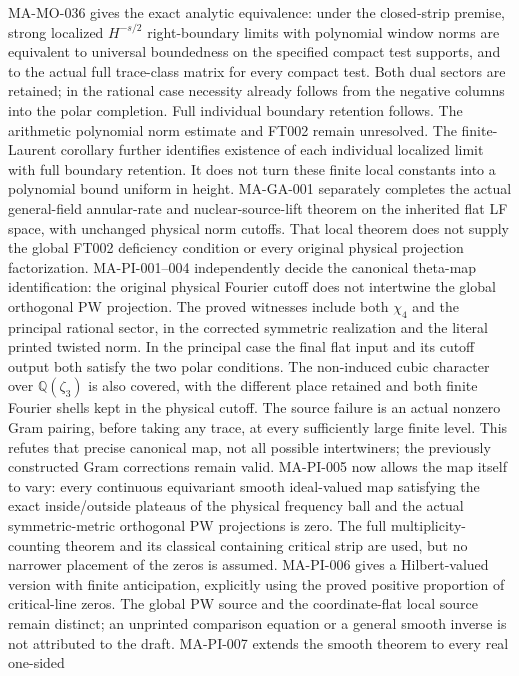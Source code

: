 \documentclass[11pt,a4paper]{article}
\begin{document}
MA-MO-036 gives the exact analytic equivalence: under the
closed-strip premise, strong localized $H^{-s/2}$ right-boundary
limits with polynomial window norms are equivalent to universal
boundedness on the specified compact test supports, and to the
actual full trace-class matrix for every compact test. Both dual
sectors are retained; in the rational case necessity already
follows from the negative columns into the polar completion.
Full individual boundary retention follows. The arithmetic
polynomial norm estimate and FT002 remain unresolved.
The finite-Laurent corollary further identifies existence of each
individual localized limit with full boundary retention. It
does not turn these finite local constants into a polynomial
bound uniform in height.
MA-GA-001 separately completes the actual
general-field annular-rate and nuclear-source-lift theorem on
the inherited flat LF space, with unchanged physical norm
cutoffs. That local theorem does not supply the global FT002
deficiency condition or every original physical projection
factorization.
MA-PI-001--004 independently decide the canonical theta-map
identification: the original physical Fourier cutoff does
not intertwine the global orthogonal PW projection. The
proved witnesses include both $\chi_4$ and the principal
rational sector, in the corrected symmetric realization
and the literal printed twisted norm. In the principal
case the final flat input and its cutoff output both
satisfy the two polar conditions. The non-induced cubic
character over $\mathbb Q(\zeta_3)$ is also covered,
with the different place retained and both finite Fourier
shells kept in the physical cutoff. The source failure is
an actual nonzero Gram pairing, before taking any trace,
at every sufficiently large finite level. This refutes
that precise canonical map, not all possible intertwiners;
the previously constructed Gram corrections remain valid.
MA-PI-005 now allows the map itself to vary: every continuous
equivariant smooth ideal-valued map satisfying the exact
inside/outside plateaus of the physical frequency ball and the
actual symmetric-metric orthogonal PW projections is zero.
The full multiplicity-counting theorem and its classical
containing critical strip are used, but no narrower placement
of the zeros is assumed. MA-PI-006 gives a Hilbert-valued version
with finite anticipation, explicitly using the proved positive
proportion of critical-line zeros. The global PW source and the
coordinate-flat local source remain distinct; an unprinted
comparison equation or a general smooth inverse is not attributed
to the draft. MA-PI-007 extends the smooth theorem to every real one-sided
\end{document}
